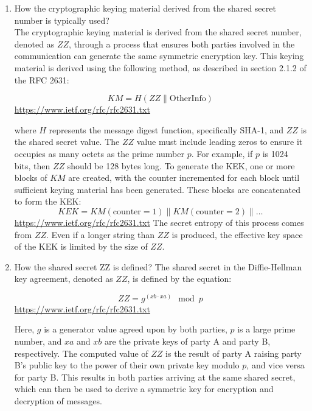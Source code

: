 \documentclass{article}
\begin{document}
\begin{enumerate}
    \item How the cryptographic keying material derived from the shared secret number is typically used?\\
    The cryptographic keying material is derived from the shared secret number, denoted as $ZZ$, through a process that ensures both parties involved in the communication can generate the same symmetric encryption key. This keying material is derived using the following method, as described in section 2.1.2 of the RFC 2631:

    \begin{equation*}
        KM = H(ZZ \parallel \text{OtherInfo})
    \end{equation*}\url{https://www.ietf.org/rfc/rfc2631.txt}

    where $H$ represents the message digest function, specifically SHA-1, and $ZZ$ is the shared secret value. The $ZZ$ value must include leading zeros to ensure it occupies as many octets as the prime number $p$. For example, if $p$ is 1024 bits, then $ZZ$ should be 128 bytes long.
    To generate the KEK, one or more blocks of $KM$ are created, with the counter incremented for each block until sufficient keying material has been generated. These blocks are concatenated to form the KEK:
    \begin{equation*}
        KEK = KM(\text{counter}=1) \parallel KM(\text{counter}=2) \parallel \ldots
    \end{equation*}\url{https://www.ietf.org/rfc/rfc2631.txt}
    The secret entropy of this process comes from $ZZ$.
    Even if a longer string than $ZZ$ is produced, the effective key space of the KEK is limited by the size of $ZZ$.
    \item How the shared secret ZZ is defined?
    The shared secret in the Diffie-Hellman key agreement, denoted as \( ZZ \), is defined by the equation:

    \begin{equation*}
        ZZ = g^{(xb \cdot xa)} \mod p
    \end{equation*}\url{https://www.ietf.org/rfc/rfc2631.txt}

    Here, \( g \) is a generator value agreed upon by both parties, \( p \) is a large prime number, and \( xa \) and \( xb \) are the private keys of party A and party B, respectively. The computed value of \( ZZ \) is the result of party A raising party B's public key to the power of their own private key modulo \( p \), and vice versa for party B. This results in both parties arriving at the same shared secret, which can then be used to derive a symmetric key for encryption and decryption of messages.



\end{enumerate}
\end{document}
